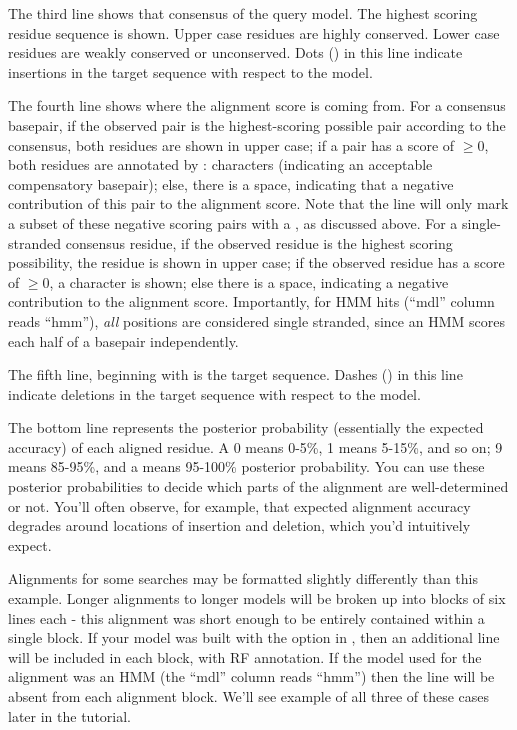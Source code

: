 The third line shows that consensus of the query model. The highest
scoring residue sequence is shown. Upper case residues are highly
conserved. Lower case residues are weakly conserved or unconserved.
Dots () in this line indicate insertions in the target
sequence with respect to the model.

The fourth line shows where the alignment score is coming from. For a
consensus basepair, if the observed pair is the highest-scoring
possible pair according to the consensus, both residues are shown in
upper case; if a pair has a score of $\geq 0$, both residues are
annotated by : characters (indicating an acceptable compensatory
basepair); else, there is a space, indicating that a negative
contribution of this pair to the alignment score. Note that the 
 line will only mark a subset of these negative scoring
pairs with a , as discussed above.
For a single-stranded consensus residue, if the observed residue is
the highest scoring possibility, the residue is shown in upper case;
if the observed residue has a score of $\geq 0$, a \otext{+} character
is shown; else there is a space, indicating a negative contribution to
the alignment score. Importantly, for HMM hits (``mdl'' column reads
``hmm''), \emph{all} positions are considered single stranded, since
an HMM scores each half of a basepair independently.

The fifth line, beginning with  is
the target sequence. Dashes (\otext{-}) in this line indicate deletions
in the target sequence with respect to the model.

The bottom line represents the posterior probability (essentially the
expected accuracy) of each aligned residue. A 0 means 0-5\%, 1 means
5-15\%, and so on; 9 means 85-95\%, and a \otext{*} means 95-100\%
posterior probability. You can use these posterior probabilities to
decide which parts of the alignment are well-determined or not. You'll
often observe, for example, that expected alignment accuracy degrades
around locations of insertion and deletion, which you'd intuitively
expect.

Alignments for some searches may be formatted slightly differently
than this example. Longer alignments to longer models will be broken
up into blocks of six lines each - this alignment was short enough to
be entirely contained within a single block.  If your model was built
with the  option in , then an additional
line will be included in each block, with RF annotation.  If the model
used for the alignment was an HMM (the ``mdl'' column reads ``hmm'')
then the  line will be absent from each alignment
block. We'll see example of all three of these cases later in the
tutorial.

